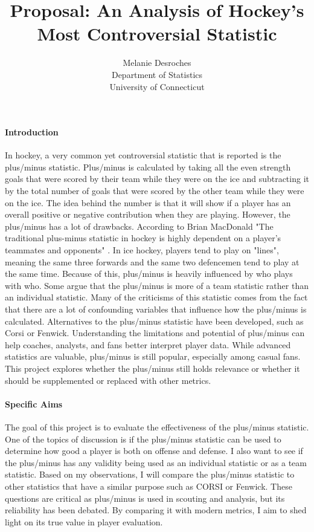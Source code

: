 \documentclass[12pt]{article}
\title{Proposal: An Analysis of Hockey's Most Controversial Statistic}
\author{Melanie Desroches\\
  Department of Statistics\\
  University of Connecticut
}
\begin{document}
\maketitle


\paragraph{Introduction}
In hockey, a very common yet controversial statistic that is reported is the plus/minus statistic. Plus/minus is 
calculated by taking all the even strength goals that were scored by their team while they were on the ice and 
subtracting it by the total number of goals that were scored by the other team while they were on the ice. The 
idea behind the number is that it will show if a player has an overall positive or negative contribution when 
they are playing. However, the plus/minus has a lot of drawbacks. According to Brian MacDonald 
"The traditional plus-minus statistic in hockey is highly dependent on a player’s teammates and opponents" \cite{Macdonald_2011}.
In ice hockey, players tend to play on "lines", meaning the same three forwards and the same two defencemen tend 
to play at the same time. Because of this, plus/minus is heavily influenced by who plays with who. Some argue that 
the plus/minus is more of a team statistic rather than an individual statistic. Many of the criticisms of this statistic 
comes from the fact that there are a lot of confounding variables that influence how the plus/minus is calculated.
Alternatives to the plus/minus statistic have been developed, such as Corsi or Fenwick. Understanding the limitations and
potential of plus/minus can help coaches, analysts, and fans better interpret player data. While advanced statistics are valuable, 
plus/minus is still popular, especially among casual fans. This project explores whether the plus/minus still holds relevance or 
whether it should be supplemented or replaced with other metrics.


\paragraph{Specific Aims}
The goal of this project is to evaluate the effectiveness of the plus/minus statistic. One of the topics of discussion is if the 
plus/minus statistic can be used to determine how good a player is both on offense and defense. I also want to see if the plus/minus 
has any validity being used as an individual statistic or as a team statistic. Based on my observations, I will compare the plus/minus 
statistic to other statistics that have a similar purpose such as CORSI or Fenwick. These questions are critical as plus/minus is used 
in scouting and analysis, but its reliability has been debated. By comparing it with modern metrics, I aim to shed light on its true 
value in player evaluation.
\end{document}
